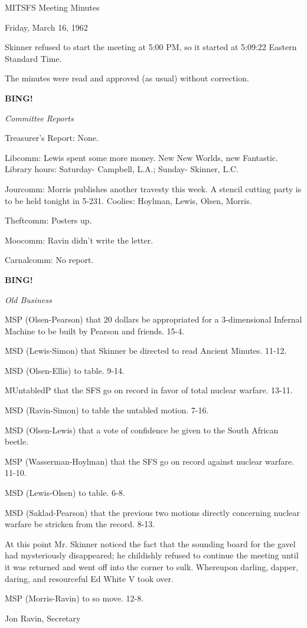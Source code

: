 \documentclass[12pt]{article}
\newcommand{\bing}{{\bf BING!} }
\newcommand{\goto}[1]{\bing \vskip 12pt \centerline{{\em{#1}}}}
\begin{document}
\begin{center}

MITSFS Meeting Minutes

Friday, March 16, 1962

\end{center}
 
\vspace{12pt}

\setlength{\parskip}{6pt}

\noindent
Skinner refused to start the meeting at 5:00 PM, so it started at 5:09:22 Eastern Standard Time.

The minutes were read and approved (as usual) without correction.

\goto{Committee Reports}

Treasurer's Report: None.

Libcomm: Lewis spent some more money. New New Worlds, new Fantastic. Library hours: Saturday- Campbell, L.A.; Sunday- Skinner, L.C.

Jourcomm: Morris publishes another travesty this week. A stencil cutting party is to be held tonight in 5-231. Coolies: Hoylman, Lewis, Olsen, Morris.

Theftcomm: Posters up.

Moocomm: Ravin didn't write the letter.

Carnalcomm: No report.

\goto{Old Business}

MSP (Olsen-Pearson) that 20 dollars be appropriated for a 3-dimensional Infernal Machine to be built by Pearson and friends. 15-4.

MSD (Lewis-Simon) that Skinner be directed to read Ancient Minutes. 11-12.

MSD (Olsen-Ellis) to table. 9-14.

MUntabledP that the SFS go on record in favor of total nuclear warfare. 13-11.

MSD (Ravin-Simon) to table the untabled motion. 7-16.

MSD (Olsen-Lewis) that a vote of confidence be given to the South African beetle.

MSP (Wasserman-Hoylman) that the SFS go on record against nuclear warfare. 11-10.

MSD (Lewis-Olsen) to table. 6-8.

MSD (Saklad-Pearson) that the previous two motions directly concerning nuclear warfare be stricken from the record. 8-13.

At this point Mr. Skinner noticed the fact that the sounding board for the gavel had mysteriously disappeared; he childishly refused to continue the meeting until it was returned and went off into the corner to sulk. Whereupon darling, dapper, daring, and resourceful Ed White V took over.

MSP (Morris-Ravin) to so move. 12-8.

\vspace{12pt}

\centerline{Jon Ravin, Secretary}
\end{document}
